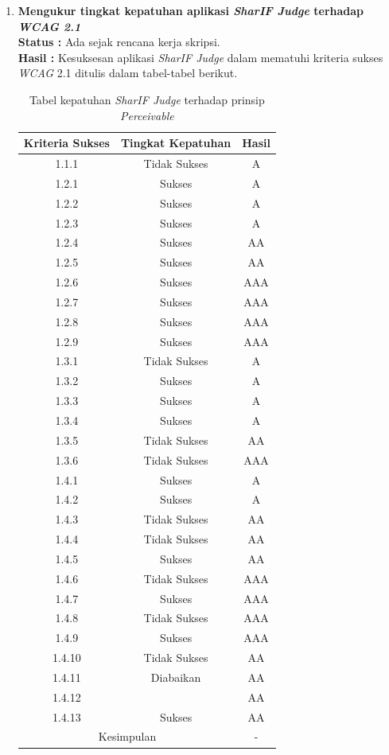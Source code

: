 \documentclass[a4paper,twoside]{article}
\begin{document}
\begin{enumerate}
		
		\item \textbf{Mengukur tingkat kepatuhan aplikasi \textit{SharIF Judge} terhadap \textit{WCAG 2.1}}\\
		{\bf Status :} Ada sejak rencana kerja skripsi.\\
		{\bf Hasil :} Kesuksesan aplikasi \textit{SharIF Judge} dalam mematuhi kriteria sukses \textit{WCAG} 2.1 ditulis dalam tabel-tabel berikut.
		
		\begin{table}[H]
			\centering
			\caption{Tabel kepatuhan \textit{SharIF Judge} terhadap prinsip \textit{Perceivable}}
			\label{tab:kepatuhan_sharif_judge_perceivable}
			\begin{tabular}{|c|c|c|}
				\hline
				Kriteria Sukses & Tingkat Kepatuhan & Hasil \\
				\hline
				1.1.1 & Tidak Sukses & A\\
				1.2.1 & Sukses & A\\
				1.2.2 & Sukses & A\\
				1.2.3 & Sukses & A\\
				1.2.4 & Sukses & AA\\
				1.2.5 & Sukses & AA\\
				1.2.6 & Sukses & AAA\\
				1.2.7 & Sukses & AAA\\
				1.2.8 & Sukses & AAA\\
				1.2.9 & Sukses & AAA\\
				1.3.1 & Tidak Sukses & A\\
				1.3.2 & Sukses & A\\
				1.3.3 & Sukses & A\\
				1.3.4 & Sukses & A\\
				1.3.5 & Tidak Sukses & AA \\
				1.3.6 & Tidak Sukses & AAA \\
				1.4.1 & Sukses & A\\
				1.4.2 & Sukses & A\\
				1.4.3 & Tidak Sukses & AA\\
				1.4.4 & Tidak Sukses & AA\\
				1.4.5 & Sukses & AA\\
				1.4.6 & Tidak Sukses & AAA\\
				1.4.7 & Sukses & AAA\\
				1.4.8 & Tidak Sukses & AAA\\
				1.4.9 & Sukses & AAA\\
				1.4.10 & Tidak Sukses & AA \\
				1.4.11 & Diabaikan & AA \\
				1.4.12 & & AA\\
				1.4.13 & Sukses & AA\\
				\hline
				\multicolumn{2}{|c|}{Kesimpulan} & - \\
				\hline
			\end{tabular}
		\end{table}
		

\end{enumerate}
\end{document}
